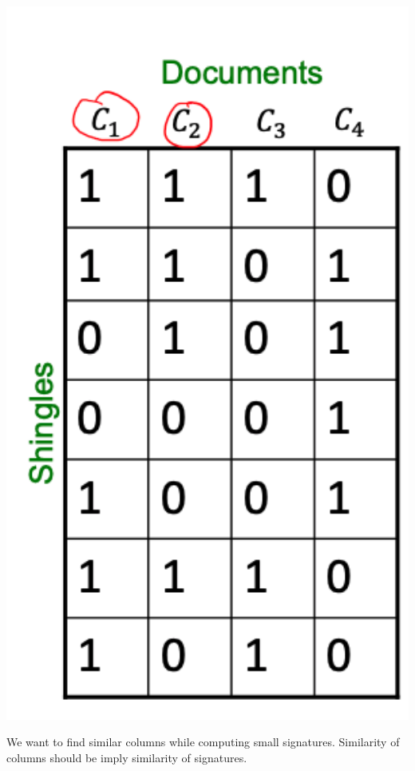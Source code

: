         \begin{center}
            \includegraphics[width=1\textwidth]{images/shinglematrix.png}
        \end{center}
        
        We want to find similar columns while computing small signatures. Similarity of columns should be imply similarity of signatures. 
        
